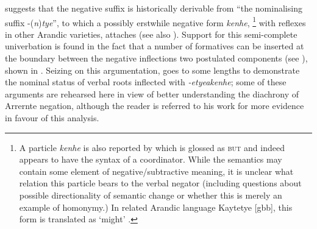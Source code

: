 \documentclass[output=paper,draft,draftmode,colorlinks,citecolor=brown]{langscibook}
\begin{document}
    \iffalse\begin{exe}
\ex Anwerne itele\textdblhyphen{ar}-etye\textdblhyphen{kwenye}
    \end{exe}\fi

\citet[235, fn 17]{Wilkins1989} suggests that the negative suffix is
    historically derivable from ``the nominalising suffix
    -(\textit{n})\textit{tye}'', to which a possibly erstwhile negative
    form \textit{kenhe},%
\footnote{A particle \textit{kenhe} is also reported by
    \citet[372]{Wilkins1989} which is glossed as \textsc{but} and indeed
    appears to have the syntax of a coordinator. While the semantics may
    contain some element of negative\slash subtractive meaning, it is
    unclear what relation this particle bears to the verbal negator
    (including questions about possible directionality of semantic change
    or whether this is merely an example of homonymy.) In related Arandic
    language Kaytetye [gbb], this form is translated as `might'
    \citep[424]{KaytetyeDict}.}
with reflexes in other Arandic varieties, attaches (see also
    \citealt[275]{Yallop1977}). Support for this semi-complete univerbation
    is found in the fact that a number of formatives can be inserted at the
    boundary between the negative inflections two postulated components
    (see \citealt[378ff]{Wilkins1989}), shown in
    . Seizing on this argumentation, \citet[411--426]{Henderson2013} goes to some lengths to demonstrate the nominal status of verbal roots inflected with \textit{-etye\textdblhyphen akenhe}; some of these arguments are rehearsed here in view of better understanding the diachrony of Arrernte negation, although the reader is referred to his work for more evidence in favour of this analysis.
\end{document}
